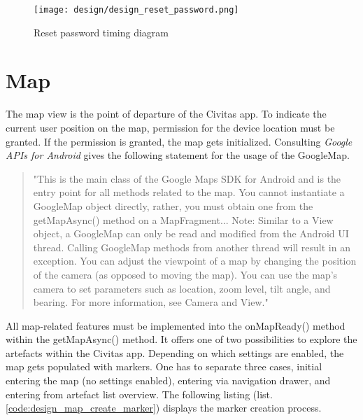 \begin{figure}[H]
    \centering \texttt{[image: design/design\_reset\_password.png]}
    \caption{Reset password timing diagram}    
    \label{fig:design_reset_password}
\end{figure} 



\section{Map}
The map view is the point of departure of the Civitas app. To indicate the current user position on the map, permission for the device location must be granted. If the permission is granted, the map gets initialized. Consulting \textit{Google APIs for Android} gives the following statement for the usage of the GoogleMap.

\begin{quote}
"This is the main class of the Google Maps SDK for Android and is the entry point for all methods related to the map. You cannot instantiate a GoogleMap object directly, rather, you must obtain one from the getMapAsync() method on a MapFragment... 
Note: Similar to a View object, a GoogleMap can only be read and modified from the Android UI thread. Calling GoogleMap methods from another thread will result in an exception. You can adjust the viewpoint of a map by changing the position of the camera (as opposed to moving the map). You can use the map's camera to set parameters such as location, zoom level, tilt angle, and bearing. For more information, see Camera and View." \cite{googleMap}
\end{quote}

All map-related features must be implemented into the onMapReady() method within the getMapAsync() method. It offers one of two possibilities to explore the artefacts within the Civitas app. Depending on which settings are enabled, the map gets populated with markers. One has to separate three cases, initial entering the map (no settings enabled), entering via navigation drawer, and entering from artefact list overview. The following listing (list. \ref{code:design_map_create_marker}) displays the marker creation process. 

\begin{mdframed}

\end{mdframed}


